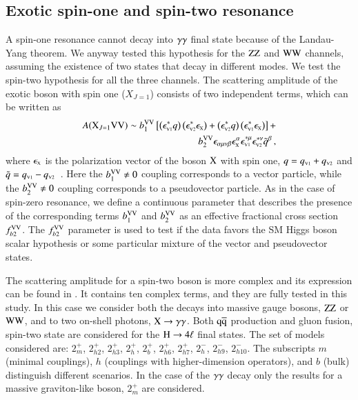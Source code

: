 \subsection{Exotic spin-one and spin-two resonance}
A spin-one resonance cannot decay into $\gamma\gamma$ final state because
of the Landau-Yang theorem. We anyway tested this hypothesis for the
$\mathrm{Z}\mathrm{Z}$ and $\mathrm{W}\mathrm{W}$ channels, assuming the existence of two states
that decay in different modes. We test the spin-two hypothesis for
all the three channels.  The scattering amplitude of the exotic boson
with spin one ($X_{J=1}$) consists of two independent terms, which can
be written as
%
\begin{eqnarray}
A(\mathrm{X}_{J=1} \mathrm{V}\mathrm{V}) \sim b_{1}^{\mathrm{V}\mathrm{V}}  \left[ \left(\epsilon_{\scriptscriptstyle\mathrm{V}1}^{*}q\right)\left(\epsilon_{\scriptscriptstyle\mathrm{V}2}^{*}\epsilon_{\scriptscriptstyle\mathrm{X}}\right) +
\left(\epsilon_{\scriptscriptstyle\mathrm{V}2}^{*}q\right)\left(\epsilon_{\scriptscriptstyle\mathrm{V}1}^{*}\epsilon_{\scriptscriptstyle\mathrm{X}}\right) \right] + \\ \nonumber 
b_{2}^{\mathrm{V}\mathrm{V}}  \epsilon_{\alpha\mu\nu\beta}\epsilon_{\scriptscriptstyle\mathrm{X}}^{\alpha}\epsilon_{\scriptscriptstyle\mathrm{V}1}^{*\mu}\epsilon_{\scriptscriptstyle\mathrm{V}2}^{*\nu}{\tilde q}^{\beta} \,,
\label{eq:ampl-spin1} 
\end{eqnarray}
%
where $\epsilon_{\scriptscriptstyle\mathrm{X}}$ is the polarization vector of the boson $\mathrm{X}$
with spin one, ${q}=q_{\scriptscriptstyle\mathrm{V}1}+q_{\scriptscriptstyle\mathrm{V}2}$ and ${\tilde
  q}=q_{\scriptscriptstyle\mathrm{V}1}-q_{\scriptscriptstyle\mathrm{V}2}$~\cite{Gao:2010qx}.
Here the $b_{1}^{\mathrm{V}\mathrm{V}} \neq 0$ coupling corresponds to a vector
particle, while the $b_{2}^{\mathrm{V}\mathrm{V}}\neq 0$ coupling corresponds to a
pseudovector particle.  As in the case of spin-zero resonance, we
define a continuous parameter that describes the presence of the
corresponding terms $b_{1}^{\mathrm{V}\mathrm{V}} $ and $b_{2}^{\mathrm{V}\mathrm{V}}$ as an effective
fractional cross section $f_{b2}^{\mathrm{V}\mathrm{V}}$.  The $f_{b2}^{\mathrm{V}\mathrm{V}}$
parameter is used to test if the data favors the SM Higgs boson scalar
hypothesis or some particular mixture of the vector and pseudovector
states.

The scattering amplitude for a spin-two boson is more complex and its
expression can be found in \cite{CMS:2014gga}.  It contains ten
complex terms, and they are fully tested in this study.  In this case
we consider both the decays into massive gauge bosons, $\mathrm{Z}\mathrm{Z}$ or
$\mathrm{W}\mathrm{W}$, and to two on-shell photons, $\mathrm{X}\to\gamma\gamma$. Both $\mathrm{\mathrm{q}\mathrm{\overline{q}}}$
production and gluon fusion, spin-two state are considered for the
$\mathrm{H}\to4\ell$ final states. The set of models considered are: $2_m^+$,
$2_{h2}^+$, $2_{h3}^+$, $2_h^+$, $2_b^+$, $2_{h6}^+$, $2_{h7}^+$,
$2_h^-$, $2_{h9}^-$, $2_{h10}^-$.  The subscripts $m$ (minimal
couplings), $h$ (couplings with higher-dimension operators), and $b$
(bulk) distinguish different scenarios.  In the case of the $\gamma\gamma$
decay only the results for a massive graviton-like boson, $2_m^+$ are
considered.
